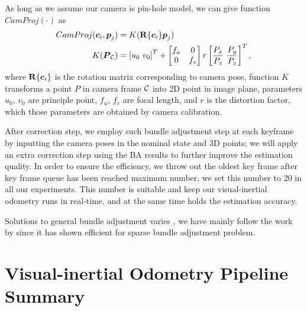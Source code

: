 As long as we assume our camera is pin-hole model, we can give function $CamProj(\cdot)$ as
\begin{align}
	\label{c2}
	CamProj(\boldsymbol{c}_i, \boldsymbol{p}_j) &= K (\mathbf{R} \{ \boldsymbol{c}_i \} \boldsymbol{p}_j) \\
	K(\boldsymbol{P}_{\mathcal{C}}) &= \left[ u_0 \ v_0 \right]^T + \begin{bmatrix} f_u & 0 \\
															 0 & f_v
											  \end{bmatrix} r \left[ \frac{P_x}{P_z} \ \frac{P_y}{P_z} \right]^T,
\end{align}
where $\mathbf{R} \{ \boldsymbol{c}_i \}$ is the rotation matrix corresponding to camera pose, function $K$ transforms a point $P$ in camera frame $\mathcal{C}$ into 2D point in image plane, parameters $u_0$, $v_0$ are principle point, $f_u$, $f_v$ are focal length, and $r$ is the distortion factor, which those parameters are obtained by camera calibration.

After correction step, we employ such bundle adjustment step at each keyframe by inputting the camera poses in the nominal state and 3D points; we will apply an extra correction step using the BA results to further improve the estimation quality. In order to ensure the efficiency, we throw out the oldest key frame after key frame queue has been reached maximum number, we set this number to 20 in all our experiments. This number is suitable and keep our visual-inertial odometry runs in real-time, and at the same time holds the estimation accuracy.

Solutions to general bundle adjustment varies \cite{wu2011multicore, triggs1999bundle, lourakis2009sba}, we have mainly follow the work by \cite{wu2011multicore} since it has shown efficient for sparse bundle adjustment problem.

\section{Visual-inertial Odometry Pipeline Summary}
\label{sec:pipeline_summary}

